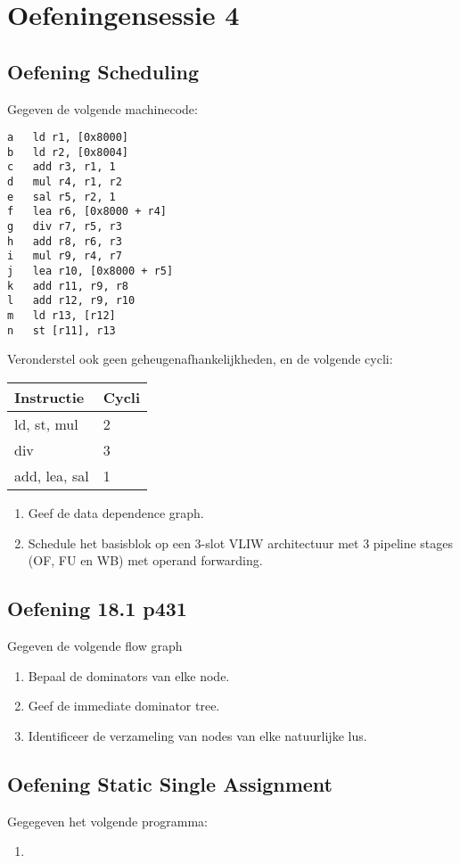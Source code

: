 \chapter{Oefeningensessie 4}


\section{Oefening Scheduling}

Gegeven de volgende machinecode:
\begin{lstlisting}
a	ld r1, [0x8000]
b	ld r2, [0x8004]
c	add r3, r1, 1
d	mul r4, r1, r2
e	sal r5, r2, 1
f	lea r6, [0x8000 + r4]
g	div r7, r5, r3
h	add r8, r6, r3
i	mul	r9, r4, r7
j	lea r10, [0x8000 + r5]
k	add r11, r9, r8
l	add r12, r9, r10
m	ld r13, [r12]
n	st [r11], r13
\end{lstlisting}
Veronderstel ook geen geheugenafhankelijkheden, en de volgende cycli:
\begin{table}
	\begin{tabular}{| l | l |}
		\hline 
		\textbf{Instructie} & \textbf{Cycli} \\
		\hline
		ld, st, mul & 2 \\
		div & 3 \\
		add, lea, sal & 1
	\end{tabular}
\end{table}

\begin{enumerate}
	\item Geef de data dependence graph.
	\item Schedule het basisblok op een 3-slot VLIW architectuur met 3 pipeline stages (OF, FU en WB) met operand forwarding.
	
\end{enumerate}

\section{Oefening 18.1 p431}
Gegeven de volgende flow graph

\begin{enumerate}
	\item Bepaal de dominators van elke node.
	\item Geef de immediate dominator tree.
	\item Identificeer de verzameling van nodes van elke natuurlijke lus.
\end{enumerate}

\section{Oefening Static Single Assignment}
Gegegeven het volgende programma:




\begin{enumerate}
	\item 
\end{enumerate}